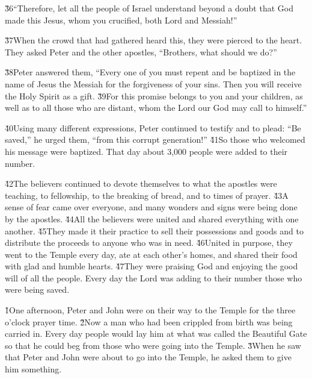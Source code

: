 \v{36}``Therefore, let all the people of Israel understand beyond a doubt that God made this Jesus, whom you crucified, both Lord and Messiah!''

\v{37}When the crowd that had gathered heard this, they were pierced to the heart. They asked Peter and the other apostles, ``Brothers, what should we do?''

\v{38}Peter answered them, ``Every one of you must repent and be baptized in the name of Jesus the Messiah for the forgiveness of your sins. Then you will receive the Holy Spirit as a gift. \v{39}For this promise belongs to you and your children, as well as to all those who are distant, whom the Lord our God may call to himself.''

\v{40}Using many different expressions, Peter continued to testify and to plead: ``Be saved,'' he urged them, ``from this corrupt generation!'' \v{41}So those who welcomed his message were baptized. That day about 3,000 people were added to their number.

\v{42}The believers continued to devote themselves to what the apostles were teaching, to fellowship, to the breaking of bread, and to times of prayer. \v{43}A sense of fear came over everyone, and many wonders and signs were being done by the apostles. \v{44}All the believers were united and shared everything with one another. \v{45}They made it their practice to sell their possessions and goods and to distribute the proceeds to anyone who was in need. \v{46}United in purpose, they went to the Temple every day, ate at each other's homes, and shared their food with glad and humble hearts. \v{47}They were praising God and enjoying the good will of all the people. Every day the Lord was adding to their number those who were being saved.

\v{1}One afternoon, Peter and John were on their way to the Temple for the three o'clock prayer time. \v{2}Now a man who had been crippled from birth was being carried in. Every day people would lay him at what was called the Beautiful Gate so that he could beg from those who were going into the Temple. \v{3}When he saw that Peter and John were about to go into the Temple, he asked them to give him something.

